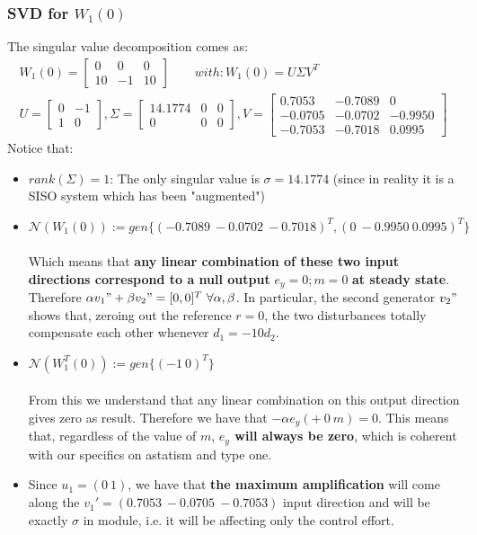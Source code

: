 \documentclass[a4paper, 12pt]{article}
\begin{document}
\subsubsection{SVD for $W_1(0)$}
The singular value decomposition comes as:
\begin{equation}
\begin{split}
        W_1(0) = 
\begin{bmatrix}
0 & 0 & 0 \\
10 & -1 & 10
\end{bmatrix} \qquad with: W_1(0) = U \Sigma V^T\\
        U = 
\begin{bmatrix}
0 & -1\\
1 & 0
\end{bmatrix},
        \Sigma = 
\begin{bmatrix}
14.1774 & 0 & 0 \\
0 & 0 & 0
\end{bmatrix},
        V = 
\begin{bmatrix}
0.7053 & -0.7089 & 0\\
-0.0705 & -0.0702 & -0.9950 \\  
 -0.7053 & -0.7018 & 0.0995
\end{bmatrix}
\end{split}
\label{eq:SVD-1}
\end{equation}
Notice that:
\begin{itemize}
\item \textbf{$rank( \Sigma )=1$}: The only singular value is $\sigma = 14.1774$ (since in reality it is a SISO system which has been "augmented")
\item $\mathcal{N}(W_1(0)):= gen\{(-0.7089\ -0.0702\ -0.7018)^T,
(0\ -0.9950\ 0.0995)^T\}$\\
\\Which means that \textbf{any linear combination of these two input directions correspond to a null output} $e_y=0; m=0$ \textbf{at steady state}. Therefore $\alpha v_1" + \beta v_2" = [0,0]^T\ \forall \alpha, \beta$. In particular, the second generator $v_{2}"$ shows that, zeroing out the reference $r=0$, the two disturbances totally compensate each other whenever $d_1 = -10d_2$.
\item $\mathcal{N}(W_1^T(0)):= gen\{(-1\ 0)^T\}$
\\ \\
From this we understand that any linear combination on this output direction gives zero as result. Therefore we have that $-\alpha e_y (+\ 0\ m) = 0$. This means that, regardless of the value of $m$,  \textbf{$e_y$ will always be zero}, which is coherent with our specifics on astatism and type one.
\item Since $u_1 = (0\ 1)$, we have that \textbf{the maximum amplification} will come along the $v_1' =(0.7053\ -0.0705\ -0.7053)$ input direction and will be exactly $\sigma$ in module, i.e. it will be affecting only the control effort. 
\end{itemize}
\end{document}
